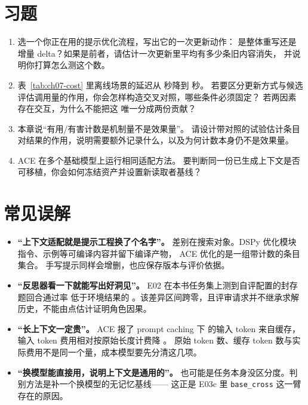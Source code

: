 \section*{习题}
\begin{enumerate}[label=7-\arabic*.,ref=7-\arabic*]
  \item\label{ex:ch07-1} 选一个你正在用的提示优化流程，写出它的一次更新动作：
        是整体重写还是增量 delta？如果是前者，请估计一次更新里平均有多少条旧内容消失，
        并说明你打算怎么测这个数。
  \item\label{ex:ch07-2} 表~\ref{tab:ch07-cost} 里离线场景的延迟从  秒降到  秒。
        若要区分更新方式与候选评估调用量的作用，你会怎样构造交叉对照，哪些条件必须固定？
        若两因素存在交互，为什么不能把这  唯一分成两份贡献？
  \item\label{ex:ch07-3} 本章说``有用/有害计数是机制量不是效果量''。
        请设计带对照的试验估计条目对结果的作用，说明需要额外记录什么，以及为何计数本身仍不是效果量。
  \item\label{ex:ch07-4} ACE 在多个基础模型上运行相同适配方法。
        要判断同一份已生成上下文是否可移植，你会如何冻结资产并设置新读取者基线？
\end{enumerate}

\section*{常见误解}
\begin{sloppypar}
\begin{itemize}
\sloppy
  \item \textbf{``上下文适配就是提示工程换了个名字''。}
        差别在搜索对象。DSPy 优化模块指令、示例等可编译内容并留下编译产物\cite{dspy-2310}，
        ACE 优化的是一组带计数的条目集合\cite{ace-2510}。
        手写提示同样会增删，也应保存版本与评价依据。
  \item \textbf{``反思器看一下就能写出好洞见''。}
        E02 在本书任务集上测到自评配置的封存题回合通过率  低于环境结果的
        。该差异区间跨零，且评审请求并不继承求解历史，不能由点估计证明角色因果。
  \item \textbf{``长上下文一定贵''。}
        ACE 报了 prompt caching 下  的输入 token 来自缓存，
        输入 token 费用相对按原始长度计费降 \cite{ace-2510}。
        原始 token 数、缓存 token 数与实际费用不是同一个量，成本模型要先分清这几项。
  \item \textbf{``换模型能直接用，说明上下文是通用的''。}
        也可能是任务本身没区分度。判别方法是补一个换模型的无记忆基线——
        这正是 E03c 里 \texttt{base\_cross} 这一臂存在的原因。
\end{itemize}
\end{sloppypar}

